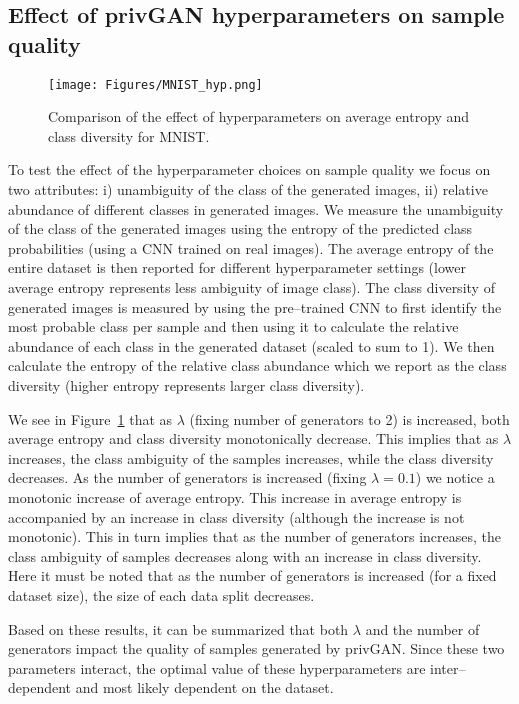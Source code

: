 \documentclass{article}
\begin{document}
\subsection{Effect of privGAN hyperparameters on sample quality}
\begin{figure}[h!]
    \centering
    \texttt{[image: Figures/MNIST\_hyp.png]}
    \caption{Comparison of the effect of hyperparameters on  average entropy and class diversity for MNIST.}
    \label{hyp-mnist}
\end{figure}

To test the effect of the hyperparameter choices on sample quality we focus on two attributes: i) unambiguity of the class of the generated images, ii) relative abundance of different classes in generated images. We measure the unambiguity of the class of the generated images using the entropy of the predicted class probabilities (using a CNN trained on real images). The average entropy of the entire dataset is then reported for different hyperparameter settings (lower average entropy represents less ambiguity of image class). The class diversity of generated images is measured by using the pre--trained CNN to first identify the most probable class per sample and then using it to calculate the relative abundance of each class in the generated dataset (scaled to sum to 1). We then calculate the entropy of the relative class abundance which we report as the class diversity (higher entropy represents larger class diversity). 

We see in Figure~\ref{hyp-mnist} that as $\lambda$ (fixing number of generators to 2) is increased, both average entropy and class diversity monotonically decrease. This implies that as $\lambda$ increases, the class ambiguity of the samples increases, while the class diversity decreases. As the number of generators is increased (fixing $\lambda=0.1$) we notice a monotonic increase of average entropy. This increase in average entropy is accompanied by an increase in class diversity (although the increase is not monotonic). This in turn implies that as the number of generators increases, the class ambiguity of samples decreases along with an increase in class diversity. Here it must be noted that as the number of generators is increased (for a fixed dataset size), the size of each data split decreases.  

Based on these results, it can be summarized that both $\lambda$ and the number of generators impact the quality of samples generated by privGAN. Since these two parameters interact, the optimal value of these hyperparameters are inter--dependent and most likely dependent on the dataset. 
\end{document}
